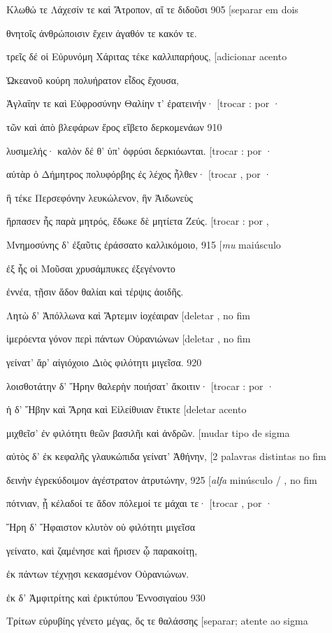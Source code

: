 Κλωθώ τε Λάχεσίν τε καὶ Ἄτροπον, αἵ τε διδοῦσι 905 {[}separar em dois

θνητοῖς ἀνθρώποισιν ἔχειν ἀγαθόν τε κακόν τε.

τρεῖς δέ οἱ Εὐρυνόμη Χάριτας τέκε καλλιπαρήους, {[}adicionar acento

Ὠκεανοῦ κούρη πολυήρατον εἶδος ἔχουσα,

Ἀγλαΐην τε καὶ Εὐφροσύνην Θαλίην τ' ἐρατεινήν· {[}trocar : por ·

τῶν καὶ ἀπὸ βλεφάρων ἔρος εἴβετο δερκομενάων 910

λυσιμελής· καλὸν δέ θ' ὑπ' ὀφρύσι δερκιόωνται. {[}trocar : por ·

αὐτὰρ ὁ Δήμητρος πολυφόρβης ἐς λέχος ἦλθεν· {[}trocar , por ·

ἣ τέκε Περσεφόνην λευκώλενον, ἣν Ἀιδωνεὺς

ἥρπασεν ἧς παρὰ μητρός, ἔδωκε δὲ μητίετα Ζεύς. {[}trocar : por ,

Μνημοσύνης δ' ἐξαῦτις ἐράσσατο καλλικόμοιο, 915 {[}\emph{mu} maiúsculo

ἐξ ἧς οἱ Μοῦσαι χρυσάμπυκες ἐξεγένοντο

ἐννέα, τῇσιν ἅδον θαλίαι καὶ τέρψις ἀοιδῆς.

Λητὼ δ' Ἀπόλλωνα καὶ Ἄρτεμιν ἰοχέαιραν {[}deletar , no fim

ἱμερόεντα γόνον περὶ πάντων Οὐρανιώνων {[}deletar , no fim

γείνατ' ἄρ' αἰγιόχοιο Διὸς φιλότητι μιγεῖσα. 920

λοισθοτάτην δ' Ἥρην θαλερὴν ποιήσατ' ἄκοιτιν· {[}trocar : por ·

ἡ δ' Ἥβην καὶ Ἄρηα καὶ Εἰλείθυιαν ἔτικτε {[}deletar acento

μιχθεῖσ' ἐν φιλότητι θεῶν βασιλῆι καὶ ἀνδρῶν. {[}mudar tipo de sigma

αὐτὸς δ' ἐκ κεφαλῆς γλαυκώπιδα γείνατ' Ἀθήνην, {[}2 palavras distintas
no fim

δεινὴν ἐγρεκύδοιμον ἀγέστρατον ἀτρυτώνην, 925 {[}\emph{alfa} minúsculo /
, no fim

πότνιαν, ᾗ κέλαδοί τε ἅδον πόλεμοί τε μάχαι τε· {[}trocar , por ·

Ἥρη δ' Ἥφαιστον κλυτὸν οὐ φιλότητι μιγεῖσα

γείνατο, καὶ ζαμένησε καὶ ἤρισεν ᾧ παρακοίτῃ,

ἐκ πάντων τέχνῃσι κεκασμένον Οὐρανιώνων.

ἐκ δ' Ἀμφιτρίτης καὶ ἐρικτύπου Ἐννοσιγαίου 930

Τρίτων εὐρυβίης γένετο μέγας, ὅς τε θαλάσσης {[}separar; atente ao sigma

